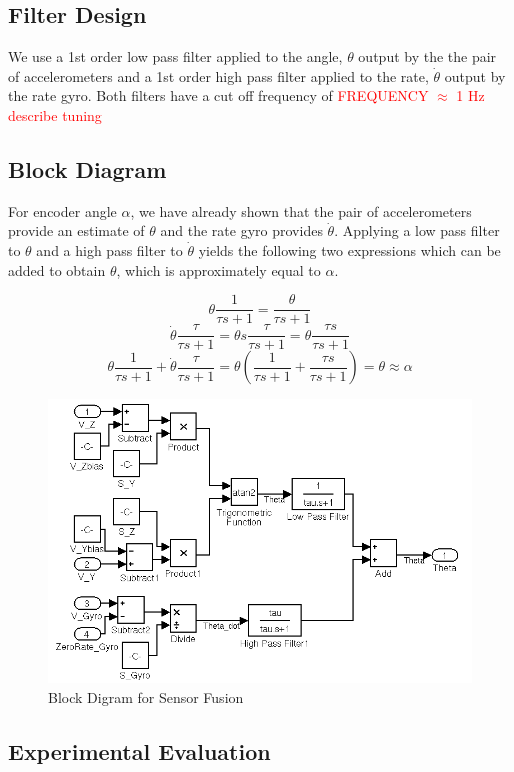\documentclass{article}
\newcommand{\xxx}[1]{\textcolor{red}{#1}}
\theoremstyle{plain}
\theoremstyle{definition}
\theoremstyle{remark}
\begin{document}
\subsection{Filter Design}

We use a 1st order low pass filter applied to the angle, $\theta$ output by the the pair of accelerometers and a 1st order high pass filter applied to the rate, $\dot{\theta}$ output by the rate gyro.  Both filters have a cut off frequency of \xxx{FREQUENCY $\approx$ 1 Hz} \xxx{describe tuning} 

\subsection{Block Diagram}

For encoder angle $\alpha$, we have already shown that the pair of accelerometers provide an estimate of $\theta$ and the rate gyro provides $\dot{\theta}$.  Applying a low pass filter to $\theta$ and a high pass filter to $\dot{\theta}$ yields the following two expressions which can be added to obtain $\theta$, which is approximately equal to $\alpha$.  

$$ \theta \frac{1}{\tau s + 1} = \frac{\theta}{\tau s + 1} $$
$$ \dot{\theta} \frac{\tau}{\tau s + 1} = \theta s \frac{\tau}{\tau s + 1} = \theta \frac{\tau s}{\tau s + 1} $$
$$ \theta \frac{1}{\tau s + 1} + \dot{\theta} \frac{\tau}{\tau s + 1} = \theta \left(\frac{1}{\tau s + 1} + \frac{\tau s}{\tau s + 1}  \right) = \theta \approx \alpha $$

\begin{figure}
\begin{center}
\includegraphics[width = 14cm]{fusion_BlockDiagram.png}
\caption{Block Digram for Sensor Fusion}
\label{fusion_Block}
\end{center}
\end{figure}

\subsection{Experimental Evaluation}
\end{document}
